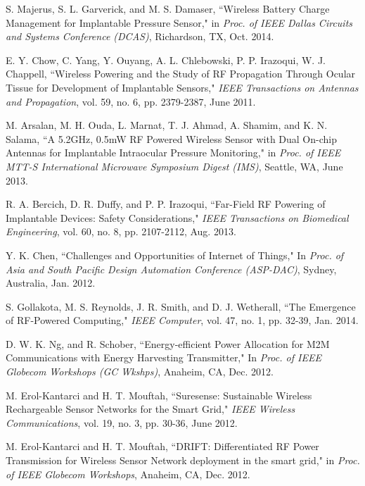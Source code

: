\documentclass[twocolumn,10pt]{IEEEtran}
\begin{document}
\begin{thebibliography}{99}
S. Majerus, S. L. Garverick, and M. S. Damaser, ``Wireless Battery Charge Management for Implantable Pressure Sensor," in \emph{Proc. of IEEE Dallas Circuits and Systems Conference (DCAS)}, Richardson, TX, Oct. 2014.  

E. Y. Chow, C. Yang, Y. Ouyang, A. L. Chlebowski, P. P. Irazoqui, W. J.  Chappell, ``Wireless Powering and the Study of RF Propagation Through Ocular Tissue for Development of Implantable Sensors," \emph{IEEE Transactions on Antennas and Propagation}, vol. 59, no. 6, pp. 2379-2387, June  2011.

M. Arsalan,  M. H. Ouda, L. Marnat,  T. J.  Ahmad, A. Shamim, and K. N. Salama,  ``A 5.2GHz, 0.5mW RF Powered Wireless Sensor with Dual On-chip Antennas for Implantable Intraocular Pressure Monitoring," in \emph{Proc. of IEEE MTT-S International Microwave Symposium Digest (IMS)}, Seattle, WA, June  2013. 

R. A. Bercich, D. R. Duffy, and P. P. Irazoqui,  
``Far-Field RF Powering of Implantable Devices: Safety Considerations," \emph{IEEE Transactions on Biomedical Engineering}, vol. 60, no. 8, pp. 2107-2112, Aug. 2013.

Y. K. Chen,  ``Challenges and Opportunities of Internet of Things," In \emph{Proc. of Asia and South Pacific Design Automation Conference (ASP-DAC)}, Sydney, Australia, Jan. 2012.

S. Gollakota, M. S. Reynolds, J. R. Smith, and D. J. Wetherall, ``The Emergence of RF-Powered Computing," \emph{IEEE Computer}, vol. 47, no. 1, pp. 32-39, Jan. 2014.

D. W. K. Ng, and R. Schober,   ``Energy-efficient Power Allocation for M2M Communications with Energy Harvesting Transmitter," In \emph{Proc. of IEEE Globecom Workshops (GC Wkshps)}, Anaheim, CA, Dec. 2012.
 
M. Erol-Kantarci and H. T. Mouftah, ``Suresense: Sustainable Wireless Rechargeable Sensor Networks for the Smart Grid," \emph{IEEE Wireless Communications}, vol. 19, no. 3, pp. 30-36, June 2012. 
 
M. Erol-Kantarci and H. T. Mouftah, ``DRIFT: Differentiated RF Power Transmission for Wireless Sensor Network deployment in the smart grid," in \emph{Proc. of IEEE Globecom Workshops},   Anaheim, CA, Dec. 2012.   
 

\end{thebibliography}
\end{document}
